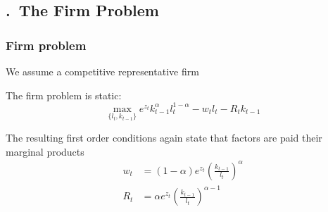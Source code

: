\documentclass[handout,usepdftitle=false,xcolor=dvipsnames,aspectratio=169]{beamer}
\begin{document}
\subsection{\thesection.\thesubsection \ The Firm Problem}
\renewcommand{\Source}{\textcite{Krueger2012}, Ch. 4.3.2}
\begin{frame}
\frametitle{Firm problem}
\begin{witemize}
\item We assume a competitive representative firm
\item The firm problem is static:
 \begin{equation}
    \max_{\{l_t,{k}_{t-1}\}} e^{z_t} {k}_{t-1}^{\alpha} l_t^{1-\alpha} - {w}_t l_t - R_t {k}_{t-1}
 \end{equation}
\item The resulting first order conditions again state that factors are paid their marginal products
\begin{align}
  w_t &= (1-\alpha)e^{z_t} \left(\frac{k_{t-1}}{l_t} \right)^{\alpha} \label{eq:labor_demand}\\
  R_t &= \alpha e^{z_t} \left(\frac{k_{t-1}}{l_t} \right)^{\alpha-1} \label{eq:k_demand}
\end{align}
\end{witemize}
\end{frame}

\end{document}
